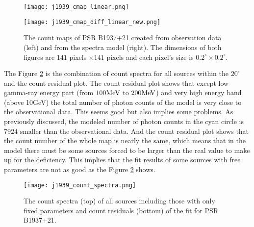 \documentclass[a4paper, 12pt]{report}
\begin{document}
        \begin{figure}[!htp]
          \begin{center}
          \begin{minipage}{0.45\textwidth}
            \begin{center} 
              \texttt{[image: j1939\_cmap\_linear.png]}
            \end{center}
          \end{minipage}
          \begin{minipage}{0.45\textwidth}
            \begin{center}
              \texttt{[image: j1939\_cmap\_diff\_linear\_new.png]}
            \end{center}
          \end{minipage}
          \end{center}

          \caption[The count maps of PSR B1937+21 created from observation 
                  data (left) and from the spectra model (right).]
            {The count maps of PSR B1937+21 created from observation 
            data (left) and from the spectra model (right). The dimensions
            of both figures are $141$ pixels $\times 141$ pixels and each pixel's size is
            $0.2^{\circ}\times0.2^{\circ}$.}
          \label{fig: j1939_count_map_diff}
        \end{figure}

        The Figure \ref{fig: j1939_count_spectra} is the combination of count spectra for 
        all sources within the $20^{\circ}$ and the count residual plot. The count residual 
        plot shows that except low gamma-ray energy part (from $100\hbox{MeV}$ to 
        $200\hbox{MeV}$) and very high energy band (above 10GeV) the total number of photon 
        counts of the model is very close to the observational data. This seems good but 
        also implies some problems. As previously discussed, the modeled number of photon counts 
        in the cyan circle is $7924$ smaller than the observational data. And the count residual 
        plot shows that the count number of the whole map is nearly the same, which means that 
        in the model there must be some sources forced to be larger than the real value to make 
        up for the deficiency. This implies that the fit results of some sources with free 
        parameters are not as good as the Figure \ref{fig: j1939_count_spectra} shows. 
        
        \begin{figure}[!htp]
          \centering
          \texttt{[image: j1939\_count\_spectra.png]}
          \caption{The count spectra (top) of all sources including those with only fixed 
            parameters and count residuals (bottom) of the fit for PSR B1937+21.}
          \label{fig: j1939_count_spectra}
        \end{figure}
\end{document}
